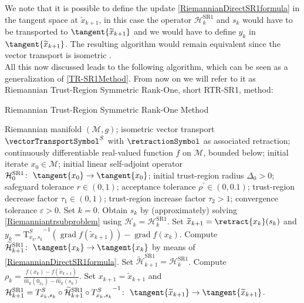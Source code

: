 We note that it is possible to define the update \cref{RiemannianDirectSR1formula} in the tangent space at $\widetilde{x}_{k+1}$, in this case the operator $\mathcal{H}^\mathrm{SR1}_k$ and $s_k$ would have to be transported to $\tangent{\widetilde{x}_{k+1}}$ and we would have to define $y_k$ in $\tangent{\widetilde{x}_{k+1}}$. The resulting algorithm would remain equivalent since the vector transport is isometric \cite[p.~5]{HuangAbsilGallivan:2014}. \\

All this now discussed leads to the following algorithm, which can be seen as a generalization of \cref{TR-SR1Method}. From now on we will refer to it as Riemannian Trust-Region Symmetric Rank-One, short RTR-SR1, method:

\begin{algorithm}[H]
    \caption{Riemannian Trust-Region Symmetric Rank-One Method}\label{RTR-SR1Method}
    \begin{algorithmic}[1]
        \State Riemannian manifold $(\mathcal{M}, g)$; isometric vector transport $\vectorTransportSymbol^S$ with $\retractionSymbol$ as associated retraction; continuously differentiable real-valued function $f$ on $\mathcal{M}$, bounded below; initial iterate $x_0 \in \mathcal{M}$; initial linear self-adjoint operator $\mathcal{H}^\mathrm{SR1}_0 \colon \ \tangent{x_0} \to \tangent{x_0}$; initial trust-region radius $\Delta_0 > 0$; safeguard tolerance $r \in (0,1)$; acceptance tolerance $\rho^{\prime} \in (0, 0.1)$; trust-region decrease factor $\tau_1 \in (0,1)$; trust-region increase factor $\tau_2 > 1$; convergence tolerance $\varepsilon > 0$. Set $k = 0$.
            \State Obtain $s_k$ by (approximately) solving \cref{Riemanniantrsubproblem} using $\mathcal{H}_k = \mathcal{H}^\mathrm{SR1}_k$.
            \State Set $\widetilde{x}_{k+1} = \retract{x_k}(s_k)$ and $y_k = {\mathrm{T}^{S}_{x_k, s_k}}^{-1} ( \operatorname{grad}f(\widetilde{x}_{k+1}) ) - \operatorname{grad}f(x_k)$.
                \State Compute $\widetilde{\mathcal{H}}^\mathrm{SR1}_{k+1} \colon \ \tangent{x_{k}} \to \tangent{x_{k}}$ by means of \cref{RiemannianDirectSR1formula}.
			\Else 
				\State Set $\widetilde{\mathcal{H}}^\mathrm{SR1}_{k+1} = \mathcal{H}^\mathrm{SR1}_k$.
            \EndIf 
            \State Compute $\rho_k = \frac{f(x_k) - f(\widetilde{x}_{k+1})}{\hat{m}_k(0_{x_k}) - \hat{m}_k(s_k)}$.
                \State Set $x_{k+1} = \widetilde{x}_{k+1}$ and $\mathcal{H}^\mathrm{SR1}_{k+1} = T^{S}_{x_k, s_k} \circ \widetilde{\mathcal{H}}^\mathrm{SR1}_{k+1} \circ  {T^{S}_{x_k, s_k}}^{-1} \colon \ \tangent{\widetilde{x}_{k+1}} \to \tangent{\widetilde{x}_{k+1}}$.

\end{algorithmic}
\end{algorithm}
